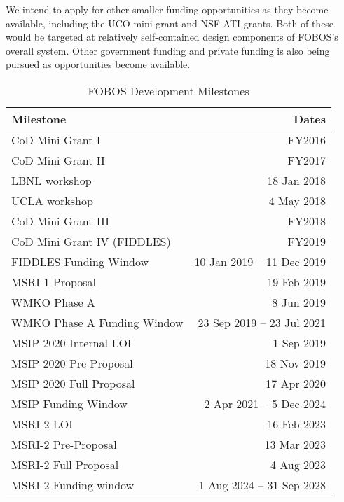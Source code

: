 We intend to apply for other smaller funding opportunities as they
become available, including the UCO mini-grant and NSF ATI grants.
Both of these would be targeted at relatively self-contained design
components of FOBOS's overall system. Other government funding and
private funding is also being pursued as opportunities become
available.

\begin{table}[h!]
\centering
\footnotesize
\caption{FOBOS Development Milestones}
\label{tab:milestones}
\vspace*{-10pt}
\begin{tabular}{l r}
Milestone                     & Dates \\
\hline
\hline
CoD Mini Grant I              & FY2016 \\
CoD Mini Grant II             & FY2017 \\
LBNL workshop                 & 18 Jan 2018 \\
UCLA workshop                 & 4 May 2018 \\
CoD Mini Grant III            & FY2018 \\
CoD Mini Grant IV (FIDDLES)   & FY2019 \\
FIDDLES Funding Window        & 10 Jan 2019 -- 11 Dec 2019 \\
\hline
MSRI-1 Proposal               & 19 Feb 2019 \\
WMKO Phase A                  & 8 Jun 2019 \\
WMKO Phase A Funding Window   & 23 Sep 2019 -- 23 Jul 2021 \\
\hline
MSIP 2020 Internal LOI        & 1 Sep 2019 \\
MSIP 2020 Pre-Proposal        & 18 Nov 2019 \\
MSIP 2020 Full Proposal       & 17 Apr 2020 \\
MSIP Funding Window           & 2 Apr 2021 -- 5 Dec 2024 \\
\hline
MSRI-2 LOI                    & 16 Feb 2023 \\
MSRI-2 Pre-Proposal           & 13 Mar 2023 \\
MSRI-2 Full Proposal          & 4 Aug 2023 \\
MSRI-2 Funding window         & 1 Aug 2024 -- 31 Sep 2028 \\
\hline
\end{tabular}
\end{table}








